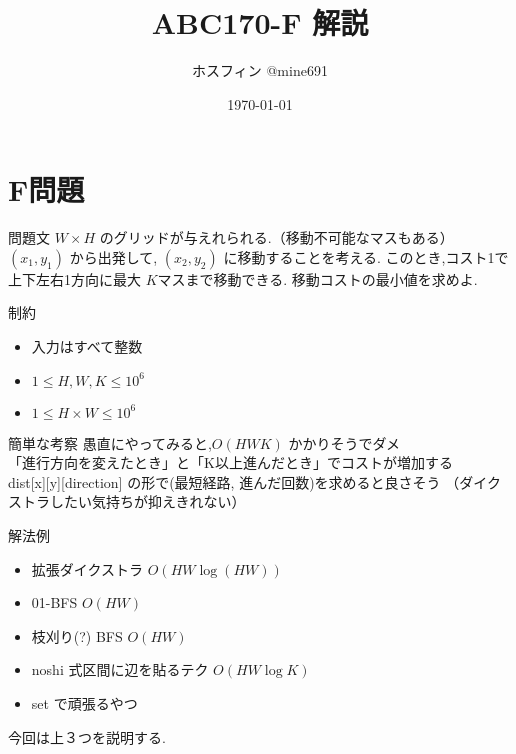 \documentclass[dvipdfmx,12pt]{beamer}%
\title{ABC170-F 解説}
\author{ホスフィン @mine691}
\date{\today}
\begin{document}
\maketitle
%

\section{F問題}
\begin{frame} %
\begin{block}{問題文}
$ W \times H $ のグリッドが与えれられる.（移動不可能なマスもある）
$ (x_1, y_1) $ から出発して, $ (x_2, y_2) $ に移動することを考える.
このとき,コスト1で上下左右1方向に最大 $ K $マスまで移動できる.
移動コストの最小値を求めよ.
\end{block}


\begin{exampleblock}{制約}

	\begin{itemize}
		\item 入力はすべて整数
		\item $ 1 \leq H, W, K \leq 10 ^ {6} $
		\item $1 \leq H \times W \leq 10 ^ {6} $
	\end{itemize}

\end{exampleblock}

\end{frame}

\begin{frame}{簡単な考察}
愚直にやってみると,$ O(HWK) $ かかりそうでダメ \\
「進行方向を変えたとき」と「K以上進んだとき」でコストが増加する\\
dist[x][y][direction] の形で(最短経路, 進んだ回数)を求めると良さそう （ダイクストラしたい気持ちが抑えきれない）\\
\end{frame}

\begin{frame} {解法例}
\begin{itemize}
	\item 拡張ダイクストラ  $ O(HW \log (HW)) $
	\item 01-BFS  $ O(HW) $
	\item 枝刈り(?) BFS  $ O(HW) $
	\item noshi 式区間に辺を貼るテク  $ O(HW \log K) $
	\item set で頑張るやつ  
\end{itemize}
今回は上３つを説明する.
\end{frame}
\end{document}
